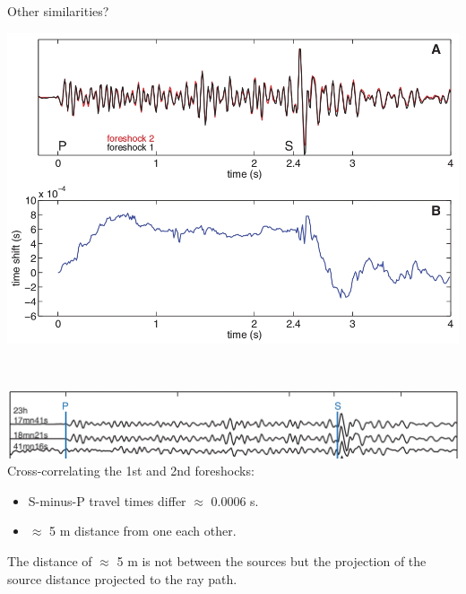 \documentclass[aspectratio=43,9pt]{beamer}
\begin{document}
\begin{frame}{Other similarities?}

 \begin{minipage}{0.52\linewidth}
  \includegraphics[width=1\linewidth]{Figs/fig4.jpg} 
 \end{minipage} \,
\begin{minipage}{0.45\linewidth}
  \includegraphics[width=1\linewidth]{Figs/fig4_1-2.jpg} \\
 Cross-correlating the 1st and 2nd foreshocks:
 \begin{itemize}
  \item  S-minus-P travel times differ $\approx$ 0.0006 s.
  \item  $\approx$ 5 m distance from one each other.
 \end{itemize}
\end{minipage}
\vskip 0.7cm
\centering The distance of $\approx$ 5 m is not between the sources but the 
projection of the source distance projected to the ray path.
 
\end{frame}
\end{document}
